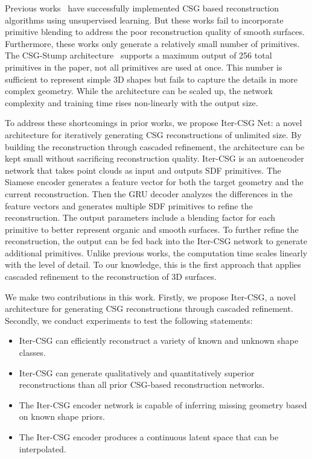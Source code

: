 Previous works~\cite{Sharma2018, Kania2020, Ren2021} have successfully implemented CSG based reconstruction algorithms using unsupervised learning. But these works fail to incorporate primitive blending to address the poor reconstruction quality of smooth surfaces. Furthermore, these works only generate a relatively small number of primitives. The CSG-Stump architecture~\cite{Ren2021} supports a maximum output of 256 total primitives in the paper, not all primitives are used at once. This number is sufficient to represent simple 3D shapes but fails to capture the details in more complex geometry. While the architecture can be scaled up, the network complexity and training time rises non-linearly with the output size.

To address these shortcomings in prior works, we propose Iter-CSG Net: a novel architecture for iteratively generating CSG reconstructions of unlimited size. By building the reconstruction through cascaded refinement, the architecture can be kept small without sacrificing reconstruction quality. Iter-CSG is an autoencoder network that takes point clouds as input and outputs SDF primitives. The Siamese encoder generates a feature vector for both the target geometry and the current reconstruction. Then the GRU decoder analyzes the differences in the feature vectors and generates multiple SDF primitives to refine the reconstruction. The output parameters include a blending factor for each primitive to better represent organic and smooth surfaces. To further refine the reconstruction, the output can be fed back into the Iter-CSG network to generate additional primitives. Unlike previous works, the computation time scales linearly with the level of detail. To our knowledge, this is the first approach that applies cascaded refinement to the reconstruction of 3D surfaces.

We make two contributions in this work. Firstly, we propose Iter-CSG, a novel architecture for generating CSG reconstructions through cascaded refinement. Secondly, we conduct experiments to test the following statements:

\begin{itemize}
	\item Iter-CSG can efficiently reconstruct a variety of known and unknown shape classes.
	\item Iter-CSG can generate qualitatively and quantitatively superior reconstructions than all prior CSG-based reconstruction networks.
	\item The Iter-CSG encoder network is capable of inferring missing geometry based on known shape priors.
	\item The Iter-CSG encoder produces a continuous latent space that can be interpolated.
\end{itemize}